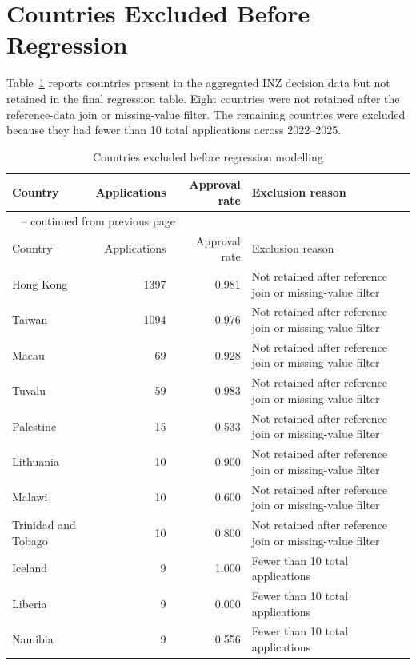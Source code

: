 \documentclass[runningheads]{llncs}
\begin{document}
\section{Countries Excluded Before Regression}

Table~\ref{tab:appendix-excluded-countries} reports countries present in the aggregated INZ decision data but not retained in the final regression table. Eight countries were not retained after the reference-data join or missing-value filter. The remaining countries were excluded because they had fewer than 10 total applications across 2022--2025.

{\scriptsize
\renewcommand{\arraystretch}{1.12}
\setlength{\tabcolsep}{5pt}
\begin{longtable}{p{}rrp{}}
\caption{Countries excluded before regression modelling}\label{tab:appendix-excluded-countries}\\
\hline
Country & Applications & Approval rate & Exclusion reason \\
\hline
\endfirsthead
\multicolumn{4}{l}{\tablename\ \thetable{} -- continued from previous page}\\
\hline
Country & Applications & Approval rate & Exclusion reason \\
\hline
\endhead
Hong Kong & 1397 & 0.981 & Not retained after reference join or missing-value filter \\
Taiwan & 1094 & 0.976 & Not retained after reference join or missing-value filter \\
Macau & 69 & 0.928 & Not retained after reference join or missing-value filter \\
Tuvalu & 59 & 0.983 & Not retained after reference join or missing-value filter \\
Palestine & 15 & 0.533 & Not retained after reference join or missing-value filter \\
Lithuania & 10 & 0.900 & Not retained after reference join or missing-value filter \\
Malawi & 10 & 0.600 & Not retained after reference join or missing-value filter \\
Trinidad and Tobago & 10 & 0.800 & Not retained after reference join or missing-value filter \\
Iceland & 9 & 1.000 & Fewer than 10 total applications \\
Liberia & 9 & 0.000 & Fewer than 10 total applications \\
Namibia & 9 & 0.556 & Fewer than 10 total applications \\

\end{longtable}}
\end{document}
